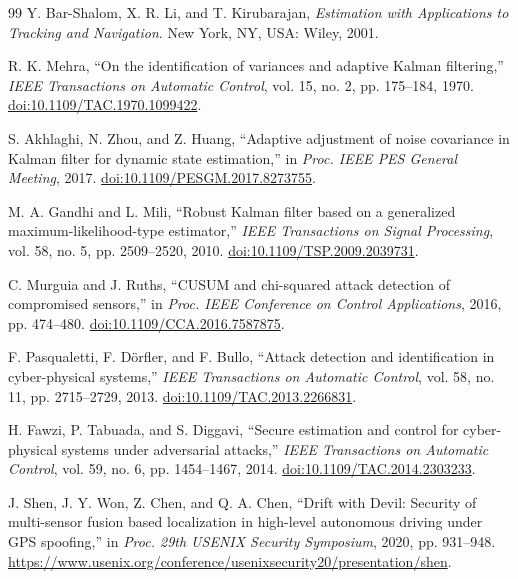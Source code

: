 \documentclass[11pt,a4paper]{article}
\begin{document}
\begin{thebibliography}{99}
Y. Bar-Shalom, X. R. Li, and T. Kirubarajan,
\emph{Estimation with Applications to Tracking and Navigation}.
New York, NY, USA: Wiley, 2001.

R. K. Mehra, ``On the identification of variances and adaptive Kalman
filtering,'' \emph{IEEE Transactions on Automatic Control}, vol. 15, no. 2,
pp. 175--184, 1970.
\href{https://doi.org/10.1109/TAC.1970.1099422}{doi:10.1109/TAC.1970.1099422}.

S. Akhlaghi, N. Zhou, and Z. Huang,
``Adaptive adjustment of noise covariance in Kalman filter for dynamic state
estimation,'' in \emph{Proc. IEEE PES General Meeting}, 2017.
\href{https://doi.org/10.1109/PESGM.2017.8273755}{doi:10.1109/PESGM.2017.8273755}.

M. A. Gandhi and L. Mili,
``Robust Kalman filter based on a generalized maximum-likelihood-type
estimator,'' \emph{IEEE Transactions on Signal Processing}, vol. 58, no. 5,
pp. 2509--2520, 2010.
\href{https://doi.org/10.1109/TSP.2009.2039731}{doi:10.1109/TSP.2009.2039731}.

C. Murguia and J. Ruths,
``CUSUM and chi-squared attack detection of compromised sensors,''
in \emph{Proc. IEEE Conference on Control Applications}, 2016, pp. 474--480.
\href{https://doi.org/10.1109/CCA.2016.7587875}{doi:10.1109/CCA.2016.7587875}.

F. Pasqualetti, F. D\"orfler, and F. Bullo,
``Attack detection and identification in cyber-physical systems,''
\emph{IEEE Transactions on Automatic Control}, vol. 58, no. 11,
pp. 2715--2729, 2013.
\href{https://doi.org/10.1109/TAC.2013.2266831}{doi:10.1109/TAC.2013.2266831}.

H. Fawzi, P. Tabuada, and S. Diggavi,
``Secure estimation and control for cyber-physical systems under adversarial
attacks,'' \emph{IEEE Transactions on Automatic Control}, vol. 59, no. 6,
pp. 1454--1467, 2014.
\href{https://doi.org/10.1109/TAC.2014.2303233}{doi:10.1109/TAC.2014.2303233}.

J. Shen, J. Y. Won, Z. Chen, and Q. A. Chen,
``Drift with Devil: Security of multi-sensor fusion based localization in
high-level autonomous driving under GPS spoofing,''
in \emph{Proc. 29th USENIX Security Symposium}, 2020, pp. 931--948.
\url{https://www.usenix.org/conference/usenixsecurity20/presentation/shen}.

\end{thebibliography}
\end{document}

